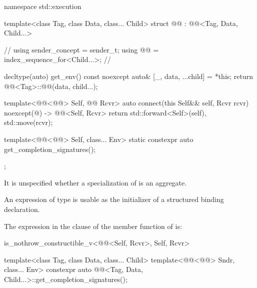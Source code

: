 \pnum
\begin{codeblock}
namespace std::execution {
  template<class Tag, class Data, class... Child>
  struct @@ : @@<Tag, Data, Child...> {     // \expos
    using sender_concept = sender_t;
    using @@ = index_sequence_for<Child...>;           // \expos

    decltype(auto) get_env() const noexcept {
      auto& [_, data, ...child] = *this;
      return @@<Tag>::@@(data, child...);
    }

    template<@@<@@> Self, @@ Rcvr>
    auto connect(this Self&& self, Rcvr rcvr) noexcept(@\seebelow@)
      -> @@<Self, Rcvr> {
      return {std::forward<Self>(self), std::move(rcvr)};
    }

    template<@@<@@> Self, class... Env>
    static constexpr auto get_completion_signatures();
  };
}
\end{codeblock}

\pnum
It is unspecified whether a specialization of 
is an aggregate.

\pnum
An expression of type  is usable as
the initializer of a structured binding declaration.

\pnum
The expression in the  clause of
the  member function of  is:
\begin{codeblock}
is_nothrow_constructible_v<@@<Self, Rcvr>, Self, Rcvr>
\end{codeblock}

%
\begin{itemdecl}
template<class Tag, class Data, class... Child>
  template<@@<@@> Sndr, class... Env>
    constexpr auto @@<Tag, Data, Child...>::get_completion_signatures();
\end{itemdecl}

